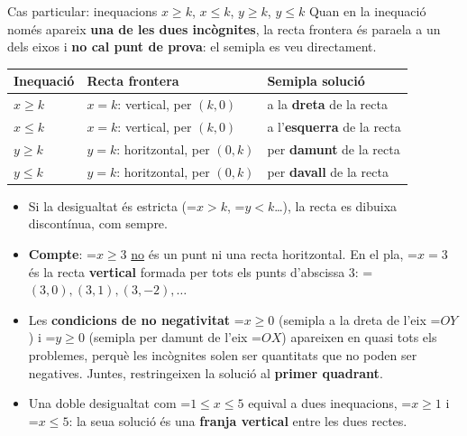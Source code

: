 \documentclass[11pt,a4paper]{article}
\newcommand{\lt}{<}\newcommand{\gt}{>}
\newcommand{\fmm}[1]{\setbox0=\hbox{$#1$}\ifdim\wd0>\linewidth\fmdisp{#1}\else\mbox{\box0}\fi}
\newcommand{\fmdisp}[1]{\[\setbox2=\hbox{$\displaystyle #1$}\ifdim\wd2>\linewidth\resizebox{\linewidth}{!}{\box2}\else\box2\fi\]}
\begin{document}
\begin{fmprop}{Cas particular: inequacions $x\geq k$, $x\leq k$, $y\geq k$, $y\leq k$}
Quan en la inequació només apareix \textbf{una de les dues incògnites}, la recta frontera és para\lgem{}ela a un dels eixos i \textbf{no cal punt de prova}: el semipla es veu directament.

\begin{center}\renewcommand{\arraystretch}{1.5}\small\begin{tabularx}{\linewidth}{>{\raggedright\arraybackslash}p{3.2cm}>{\raggedright\arraybackslash}X>{\raggedright\arraybackslash}X}\toprule
\textbf{Inequació} & \textbf{Recta frontera} & \textbf{Semipla solució}\\\midrule
$x\geq k$ & $x=k$: vertical, per $(k,0)$ & a la \textbf{dreta} de la recta\\[3pt]
$x\leq k$ & $x=k$: vertical, per $(k,0)$ & a l'\textbf{esquerra} de la recta\\[3pt]
$y\geq k$ & $y=k$: horitzontal, per $(0,k)$ & per \textbf{damunt} de la recta\\[3pt]
$y\leq k$ & $y=k$: horitzontal, per $(0,k)$ & per \textbf{davall} de la recta\\[3pt]
\bottomrule\end{tabularx}\end{center}

\begin{itemize}
\item Si la desigualtat és estricta (\fmm{x\gt k}, \fmm{y\lt k}\dots{}), la recta es dibuixa discontínua, com sempre.
\item \textbf{Compte}: \fmm{x\geq3} \underline{no} és un punt ni una recta horitzontal. En el pla, \fmm{x=3} és la recta \textbf{vertical} formada per tots els punts d'abscissa 3: \fmm{(3,0),(3,1),(3,-2),\dots}
\item Les \textbf{condicions de no negativitat} \fmm{x\geq0} (semipla a la dreta de l'eix \fmm{OY}) i \fmm{y\geq0} (semipla per damunt de l'eix \fmm{OX}) apareixen en quasi tots els problemes, perquè les incògnites solen ser quantitats que no poden ser negatives. Juntes, restringeixen la solució al \textbf{primer quadrant}.
\item Una doble desigualtat com \fmm{1\leq x\leq5} equival a dues inequacions, \fmm{x\geq1} i \fmm{x\leq5}: la seua solució és una \textbf{franja vertical} entre les dues rectes.
\end{itemize}
\end{fmprop}
\end{document}
